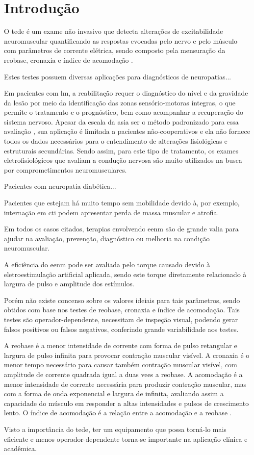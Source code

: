 \section{Introdução}

O \ac{tede} é um exame não invasivo que detecta alterações de excitabilidade neuromuscular quantificando as respostas evocadas pelo nervo e pelo músculo com parâmetros de corrente elétrica, sendo composto pela mensuração da reobase, cronaxia e índice de acomodação \cite{sluga2002,schuhfired2005,lee2013}.

Estes testes possuem diversas aplicações para diagnósticos de neuropatias...

Em pacientes com \ac{lm}, a reabilitação requer o diagnóstico do nível e da gravidade da lesão por meio da identificação das zonas sensório-motoras íntegras, o que permite o tratamento e o prognóstico, bem como acompanhar a recuperação do sistema nervoso. Apesar da escala da \ac{asia} ser o método padronizado para essa avaliação \cite{van2011}, sua aplicação é limitada a pacientes não-cooperativos e ela não fornece todos os dados necessários para o entendimento de alterações fisiológicas e estruturais secundárias. Sendo assim, para este tipo de tratamento, os exames eletrofisiológicos que avaliam a condução nervosa são muito utilizados na busca por comprometimentos neuromusculares.

Pacientes com neuropatia diabética...

Pacientes que estejam há muito tempo sem mobilidade devido à, por exemplo, internação em \ac{cti} podem apresentar perda de massa muscular e atrofia.

Em todos os casos citados, terapias envolvendo \ac{eenm} são de grande valia para ajudar na avaliação, prevenção, diagnóstico ou melhoria na condição neuromuscular.

A eficiência do \ac{eenm} pode ser avaliada pelo torque causado devido à eletroestimulação artificial aplicada, sendo este torque diretamente relacionado à largura de pulso e amplitude dos estímulos.

Porém não existe concenso sobre os valores ideiais para tais parâmetros, sendo obtidos com base nos testes de reobase, cronaxia e índice de acomodação. Tais testes são operador-dependente, necessitam de inspeção visual, podendo gerar falsos positivos ou falsos negativos, conferindo grande variabilidade aos testes.

A reobase é a menor intensidade de corrente com forma de pulso retangular e largura de pulso infinita para provocar contração muscular visível. A cronaxia é o menor tempo necessário para causar também contração muscular visível, com amplitude de corrente quadrada igual a duas vees a reobase. A acomodação é a menor intensidade de corrente necessária para produzir contração muscular, mas com a forma de onda exponencial e largura de infinita, avaliando assim a capacidade do músculo em responder a altas intensidades e pulsos de crescimento lento. O índice de acomodação é a relação entre a acomodação e a reobase \cite{sluga2002}.

Visto a importância do \ac{tede}, ter um equipamento que possa torná-lo mais eficiente e menos operador-dependente torna-se importante na aplicação clínica e acadêmica.